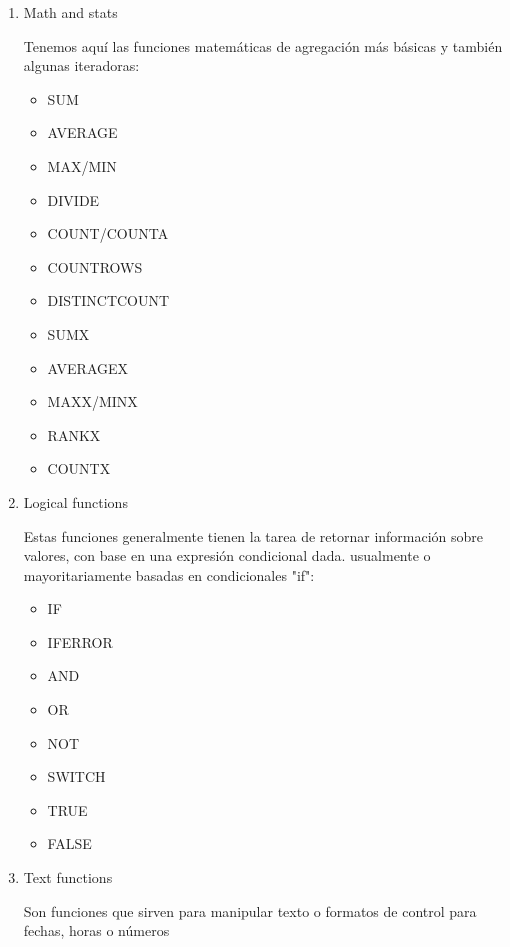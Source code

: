 \begin{enumerate}
    \item Math and stats

        Tenemos aquí las funciones matemáticas de agregación más básicas y también algunas iteradoras:
        \begin{itemize}
            \item SUM
            \item AVERAGE
            \item MAX/MIN
            \item DIVIDE
            \item COUNT/COUNTA
            \item COUNTROWS
            \item DISTINCTCOUNT
            \item SUMX
            \item AVERAGEX
            \item MAXX/MINX
            \item RANKX 
            \item COUNTX
        \end{itemize}
    \item Logical functions

        Estas funciones generalmente tienen la tarea de retornar información sobre valores, con base en una expresión condicional dada. usualmente o mayoritariamente basadas en condicionales "if":
        \begin{itemize}
            \item IF
            \item IFERROR
            \item AND
            \item OR
            \item NOT
            \item SWITCH
            \item TRUE
            \item FALSE
            
        \end{itemize}
        
    \item Text functions

        Son funciones que sirven para manipular texto o formatos de control para fechas, horas o números


\end{enumerate}
